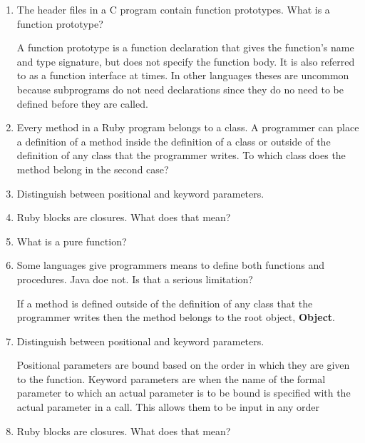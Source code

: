 \begin{enumerate}
  \item The header files in a C program contain function
    prototypes. What is a function prototype?

 \begin{answer}
   A function prototype is a function declaration that gives the
   function's name and type signature, but does not specify the
   function body. It is also referred to as a function interface at
   times. In other languages theses are uncommon because subprograms
   do not need declarations since they do no need to be defined before
   they are called.
 \end{answer}

  \item Every method in a Ruby program belongs to a class.
    A programmer can place a definition of a method inside
    the definition of a class or outside of the definition
    of any class that the programmer writes. To which class
    does the method belong in the second case?

  \item Distinguish between positional and keyword parameters.

  \item Ruby blocks are closures. What does that mean?

  \item What is a pure function?

  \item Some languages give programmers means to define
    both functions and procedures. Java doe not. Is that
    a serious limitation?

 \begin{answer}
     If a method is defined outside of the definition of any class
     that the programmer writes then the method belongs to the root
     object, \textbf{Object}.
     \end{answer}

  \item Distinguish between positional and keyword parameters.

 \begin{answer}
    Positional parameters are bound based on the order in which they
    are given to the function. Keyword parameters are when the name of
    the formal parameter to which an actual parameter is to be bound
    is specified with the actual parameter in a call. This allows them
    to be input in any order
     \end{answer}

  \item Ruby blocks are closures. What does that mean?


\end{enumerate}
